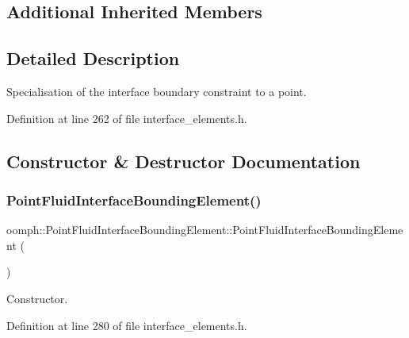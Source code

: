 \subsection*{Additional Inherited Members}


\subsection{Detailed Description}
Specialisation of the interface boundary constraint to a point. 

Definition at line 262 of file interface\+\_\+elements.\+h.



\subsection{Constructor \& Destructor Documentation}
\mbox{\label{classoomph_1_1PointFluidInterfaceBoundingElement_a920776d9680859c72f79d446a7c3d1e8}} 
\subsubsection{\texorpdfstring{Point\+Fluid\+Interface\+Bounding\+Element()}{PointFluidInterfaceBoundingElement()}}
{\footnotesize\ttfamily oomph\+::\+Point\+Fluid\+Interface\+Bounding\+Element\+::\+Point\+Fluid\+Interface\+Bounding\+Element (\begin{DoxyParamCaption}{ }\end{DoxyParamCaption})\hspace{0.3cm}{\ttfamily [inline]}}



Constructor. 



Definition at line 280 of file interface\+\_\+elements.\+h.



